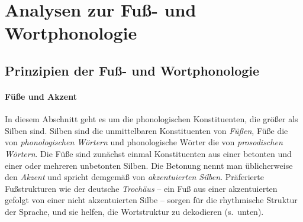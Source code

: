 \begin{exe}
\end{exe}


\newpage

\section{Analysen zur Fuß- und Wortphonologie}
\label{sec:phonologie:analysenzurfussundwortphonologie}

\subsection{Prinzipien der Fuß- und Wortphonologie}

\paragraph*{Füße und Akzent}

In diesem Abschnitt geht es um die phonologischen Konstituenten, die größer als Silben sind.
Silben sind die unmittelbaren Konstituenten von \textit{Füßen}, Füße die von \textit{phonologischen Wörtern} und phonologische Wörter die von \textit{prosodischen Wörtern}.
Die Füße sind zunächst einmal Konstituenten aus einer betonten und einer oder mehreren unbetonten Silben.
Die Betonung nennt man üblicherweise den \textit{Akzent} und spricht demgemäß von \textit{akzentuierten Silben}.
Präferierte Fußstrukturen wie der deutsche \textit{Trochäus} -- ein Fuß aus einer akzentuierten gefolgt von einer nicht akzentuierten Silbe -- sorgen für die rhythmische Struktur der Sprache, und sie helfen, die Wortstruktur zu dekodieren (s.\ unten).

